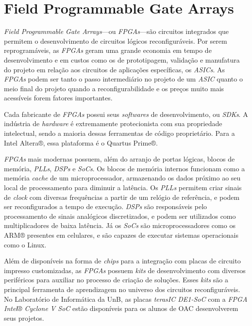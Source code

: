 \chapter{Field Programmable Gate Arrays}\label{cap_fpga}

{
    \textit{Field Programmable Gate Arrays}---ou \textit{FPGAs}---são circuitos
    integrados que permitem o desenvolvimento de circuitos lógicos
    reconfiguráveis. Por serem reprogramáveis, as \textit{FPGAs} geram uma
    grande economia em tempo de desenvolvimento e em custos como os de
    prototipagem, validação e manufatura do projeto em relação aos circuitos de
    aplicações específicas, os \textit{ASICs}. As \textit{FPGAs} podem ser
    tanto o passo intermediário no projeto de um \textit{ASIC} quanto o meio
    final do projeto quando a reconfigurabilidade e os preços muito mais
    acessíveis forem fatores importantes.
}

{
    Cada fabricante de \textit{FPGAs} possui seus \textit{softwares} de
    desenvolvimento, ou \textit{SDKs}. A indústria de \textit{hardware} é
    extremamente protecionista com sua propriedade intelectual, sendo a maioria
    dessas ferramentas de código proprietário. Para a Intel Altera®, essa
    plataforma é o Quartus Prime®.
}

{
    \textit{FPGAs} mais modernas possuem, além do arranjo de portas lógicas,
    blocos de memória, \textit{PLLs}, \textit{DSPs} e \textit{SoCs}. Os blocos
    de memória internos funcionam como a memória \textit{cache} de um
    microprocessador, armazenando os dados próximo ao seu local de
    processamento para diminuir a latência. Os \textit{PLLs} permitem criar
    sinais de \textit{clock} com diversas frequências a partir de um relógio de
    referência, e podem ser reconfigurados a tempo de execução. \textit{DSPs}
    são responsáveis pelo processamento de sinais analógicos discretizados, e
    podem ser utilizados como multiplicadores de baixa latência. Já os
    \textit{SoCs} são microprocessadores como os ARM® presentes
    em celulares, e são capazes de executar sistemas operacionais como o Linux.
}

{
    Além de disponíveis na forma de \textit{chips} para a integração com placas
    de circuito impresso customizadas, as \textit{FPGAs} possuem \textit{kits}
    de desenvolvimento com diversos periféricos para auxiliar no processo de
    criação de soluções. Esses \textit{kits} são a principal ferramenta de
    aprendizagem no universo dos circuitos reconfiguráveis. No Laboratório de
    Informática da UnB, as placas \textit{terasIC DE1-SoC} com a \textit{FPGA
    Intel® Cyclone V SoC} estão disponíveis para os alunos de OAC desenvolverem
    seus projetos.
}


